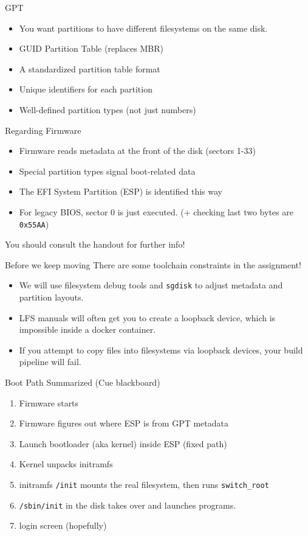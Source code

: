 \documentclass{../lecture}
\begin{document}
\begin{frame}{GPT}
  \begin{itemize}
    \item You want partitions to have different filesystems on the same disk.
    \item GUID Partition Table (replaces MBR)
    \item A standardized partition table format
    \item Unique identifiers for each partition
    \item Well-defined partition types (not just numbers)
  \end{itemize}
  \begin{block}{Regarding Firmware}
    \begin{itemize}
      \item Firmware reads metadata at the front of the disk (sectors 1-33)
      \item Special partition types signal boot-related data
      \item The EFI System Partition (ESP) is identified this way
      \item For legacy BIOS, sector 0 is just executed. (+ checking last
        two bytes are \texttt{0x55AA})
    \end{itemize}
  \end{block}
  You should consult the handout for further info!
\end{frame}

\begin{frame}{Before we keep moving}
  There are some toolchain constraints in the assignment!
  \begin{itemize}
    \item We will use filesystem debug tools and \texttt{sgdisk} to adjust
      metadata and partition layouts.
    \item LFS manuals will often get you to create a loopback device, which is
      impossible inside a docker container.
    \item If you attempt to copy files into filesystems via loopback devices,
      your build pipeline will fail.
  \end{itemize}
\end{frame}

\begin{frame}{Boot Path Summarized}
  (Cue blackboard)
  \begin{enumerate}
    \item Firmware starts
    \item Firmware figures out where ESP is from GPT metadata
    \item Launch bootloader (aka kernel) inside ESP (fixed path)
    \item Kernel unpacks initramfs
    \item initramfs \texttt{/init} mounts the real filesystem, then
      runs \texttt{switch\_root}
    \item \texttt{/sbin/init} in the disk takes over and launches programs.
    \item login screen (hopefully)
  \end{enumerate}
\end{frame}
\end{document}
